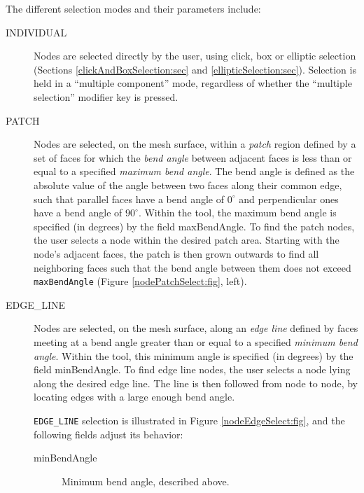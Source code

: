 \documentclass{article}
\begin{document}
The different selection modes and their parameters include:

\begin{description}

\item[INDIVIDUAL]\mbox{}

Nodes are selected directly by the user, using click, box or elliptic
selection (Sections \ref{clickAndBoxSelection:sec} and
\ref{ellipticSelection:sec}). Selection is held in a ``multiple
component'' mode, regardless of whether the ``multiple selection''
modifier key is pressed.

\item[PATCH]\mbox{}

Nodes are selected, on the mesh surface, within a {\it patch} region
defined by a set of faces for which the {\it bend angle} between
adjacent faces is less than or equal to a specified {\it maximum bend
angle}. The bend angle is defined as the absolute value of the angle
between two faces along their common edge, such that parallel faces
have a bend angle of $0^\circ$ and perpendicular ones have a bend
angle of $90^\circ$.  Within the tool, the maximum bend angle is
specified (in degrees) by the field {\sf maxBendAngle}. To find the
patch nodes, the user selects a node within the desired patch
area. Starting with the node's adjacent faces, the patch is then grown
outwards to find all neighboring faces such that the bend angle
between them does not exceed {\tt maxBendAngle} (Figure
\ref{nodePatchSelect:fig}, left).

\item[EDGE\_LINE]\mbox{}

Nodes are selected, on the mesh surface, along an {\it edge line}
defined by faces meeting at a bend angle greater than or equal to a
specified {\it minimum bend angle}.  Within the tool, this minimum
angle is specified (in degrees) by the field {\sf minBendAngle}. To
find edge line nodes, the user selects a node lying along the desired
edge line. The line is then followed from node to node, by locating
edges with a large enough bend angle.

{\tt EDGE\_LINE} selection is illustrated in Figure
\ref{nodeEdgeSelect:fig}, and the following fields adjust
its behavior:

\begin{description}

\item[{\sf minBendAngle}]\mbox{}

Minimum bend angle, described above.


\end{description}
\end{description}
\end{document}
